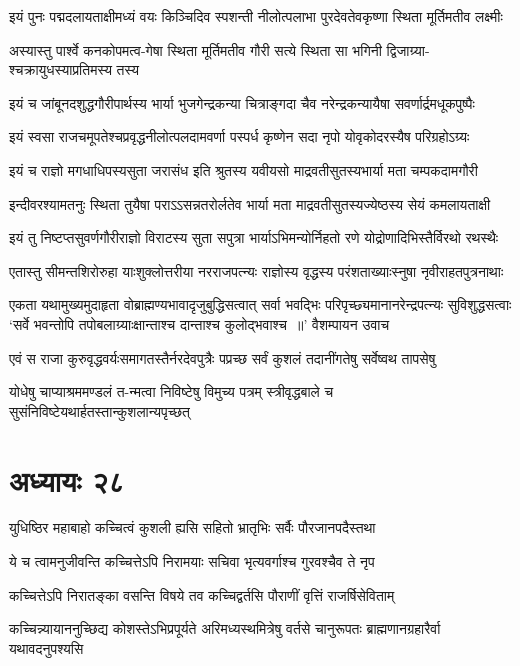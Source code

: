 \twolineshloka
{इयं पुनः पद्मदलायताक्षीमध्यं वयः किञ्चिदिव स्पशन्ती}
{नीलोत्पलाभा पुरदेवतेवकृष्णा स्थिता मूर्तिमतीव लक्ष्मीः}


\twolineshloka
{अस्यास्तु पार्श्वे कनकोपमत्व-गेषा स्थिता मूर्तिमतीव गौरी}
{सत्ये स्थिता सा भगिनी द्विजाग्र्या-श्चक्रायुधस्याप्रतिमस्य तस्य}


\twolineshloka
{इयं च जांबूनदशुद्धगौरीपार्थस्य भार्या भुजगेन्द्रकन्या}
{चित्राङ्गदा चैव नरेन्द्रकन्यायैषा सवर्णार्द्रमधूकपुष्पैः}


\twolineshloka
{इयं स्वसा राजचमूपतेश्चप्रवृद्धनीलोत्पलदामवर्णा}
{पस्पर्ध कृष्णेन सदा नृपो योवृकोदरस्यैष परिग्रहोऽग्र्यः}


\twolineshloka
{इयं च राज्ञो मगधाधिपस्यसुता जरासंध इति श्रुतस्य}
{यवीयसो माद्रवतीसुतस्यभार्या मता चम्पकदामगौरी}


\twolineshloka
{इन्दीवरश्यामतनुः स्थिता तुयैषा पराऽऽसन्नतरोर्लतेव}
{भार्या मता माद्रवतीसुतस्यज्येष्ठस्य सेयं कमलायताक्षी}


\twolineshloka
{इयं तु निष्टप्तसुवर्णगौरीराज्ञो विराटस्य सुता सपुत्रा}
{भार्याऽभिमन्योर्निहतो रणे योद्रोणादिभिस्तैर्विरथो रथस्थैः}


\twolineshloka
{एतास्तु सीमन्तशिरोरुहा याःशुक्लोत्तरीया नरराजपत्न्यः}
{राज्ञोस्य वृद्धस्य परंशताख्याःस्नुषा नृवीराहतपुत्रनाथाः}


\fourlineindentedshloka
{एकता यथामुख्यमुदाहृता वोब्राह्मण्यभावादृजुबुद्धिसत्वात्}
{सर्वा भवद्भिः परिपृच्छ्यमानानरेन्द्रपत्न्यः सुविशुद्धसत्वाः}
{`सर्वे भवन्तोपि तपोबलाग्र्याःक्षान्ताश्च दान्ताश्च कुलोद्भवाश्च ॥' वैशम्पायन उवाच}
{}


\twolineshloka
{एवं स राजा कुरुवृद्धवर्यःसमागतस्तैर्नरदेवपुत्रैः}
{पप्रच्छ सर्वं कुशलं तदानींगतेषु सर्वेष्वथ तापसेषु}


\twolineshloka
{योधेषु चाप्याश्रममण्डलं त-न्मत्वा निविष्टेषु विमुच्य पत्रम्}
{स्त्रीवृद्धबाले च सुसंनिविष्टेयथार्हतस्तान्कुशलान्यपृच्छत्}


\chapter{अध्यायः २८}
\twolineshloka
{युधिष्ठिर महाबाहो कच्चित्वं कुशली ह्यसि}
{सहितो भ्रातृभिः सर्वैः पौरजानपदैस्तथा}


\twolineshloka
{ये च त्वामनुजीवन्ति कच्चित्तेऽपि निरामयाः}
{सचिवा भृत्यवर्गाश्च गुरवश्चैव ते नृप}


\twolineshloka
{कच्चित्तेऽपि निरातङ्का वसन्ति विषये तव}
{कच्चिद्वर्तसि पौराणीं वृत्तिं राजर्षिसेविताम्}


\threelineshloka
{कच्चिन्न्यायाननुच्छिद्य कोशस्तेऽभिप्रपूर्यते}
{अरिमध्यस्थमित्रेषु वर्तसे चानुरूपतः}
{ब्राह्मणानग्रहारैर्वा यथावदनुपश्यसि}


